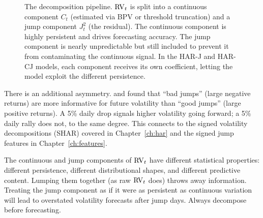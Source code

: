 \begin{figure}[htbp]
\caption{The decomposition pipeline.
$\operatorname{RV}_t$ is split into a continuous component $C_t$ (estimated via BPV or threshold truncation) and a jump component $J_t^2$ (the residual).
The continuous component is highly persistent and drives forecasting accuracy.
The jump component is nearly unpredictable but still included to prevent it from contaminating the continuous signal.
In the HAR-J and HAR-CJ models, each component receives its own coefficient, letting the model exploit the different persistence.}
\label{fig:decomposition-pipeline}
\end{figure}

There is an additional asymmetry.
\citet{BKT2015} and \citet{PSS2015} found that ``bad jumps'' (large negative returns) are more informative for future volatility than ``good jumps'' (large positive returns).
A 5\% daily drop signals higher volatility going forward; a 5\% daily rally does not, to the same degree.
This connects to the signed volatility decompositions (SHAR) covered in Chapter~\ref{ch:har} and the signed jump features in Chapter~\ref{ch:features}.

\begin{warning}
The continuous and jump components of $\operatorname{RV}_t$ have different statistical properties: different persistence, different distributional shapes, and different predictive content.
Lumping them together (as raw $\operatorname{RV}_t$ does) throws away information.
Treating the jump component as if it were as persistent as continuous variation will lead to overstated volatility forecasts after jump days.
Always decompose before forecasting.
\end{warning}



